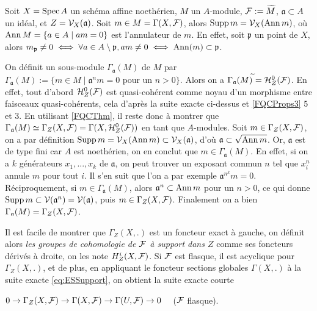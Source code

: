 \begin{ex}\label{cohomsupportaffineex}
Soit $X=\operatorname{Spec} A$ un schéma affine noethérien, $M$ un $A$-module, $\mathcal{F}:=\widetilde{M}$, $\mathfrak{a}\subset A$ un idéal, et $Z=\mathcal{V}_X(\mathfrak{a})$. Soit $m\in M=\Gamma(X,\mathcal{F})$, alors $\operatorname{Supp} m=\mathcal{V}_X(\operatorname{Ann} m)$, où $\operatorname{Ann} M=\lbrace a\in A\mid am=0\rbrace$ est l'annulateur de $m$. En effet, soit $\mathfrak{p}$ un point de $X$, alors $m_\mathfrak{p}\neq 0\iff \forall a\in A\setminus \mathfrak{p}, am\neq 0\iff \operatorname{Ann}(m)\subset \mathfrak{p}$.

On définit un sous-module $\Gamma_\mathfrak{a}(M)$ de $M$ par $\Gamma_\mathfrak{a}(M):=\lbrace m\in M\mid \mathfrak{a}^nm=0 \text{ pour un } n>0 \rbrace$. Alors on a $\Gamma_\mathfrak{a}(M)^{\widetilde{}} = \mathcal{H} ^0 _Z(\mathcal{F})$. En effet, tout d'abord $\mathcal{H}^0 _Z(\mathcal{F})$ est quasi-cohérent comme noyau d'un morphisme entre faisceaux quasi-cohérents, cela d'après la suite exacte ci-dessus et \ref{FQCProps3} $5$ et $3$. En utilisant \ref{FQCThm}, il reste donc à montrer que $\Gamma_\mathfrak{a}(M)\simeq\Gamma_Z(X,\mathcal{F})=\Gamma(X,\mathcal{H} ^0 _Z(\mathcal{F}))$ en tant que $A$-modules. Soit $m\in\Gamma_Z(X,\mathcal{F})$, on a par définition $\operatorname{Supp} m=\mathcal{V}_X(\operatorname{Ann} m)\subset \mathcal{V}_X(\mathfrak{a})$, d'où $\mathfrak{a}\subset \sqrt{\operatorname{Ann} m}$. Or, $\mathfrak{a}$ est de type fini car $A$ est noethérien, on en conclut que $m\in \Gamma_\mathfrak{a}(M)$. En effet, si on a $k$ générateurs $x_1,...,x_k$ de $\mathfrak{a}$, on peut trouver un exposant commun $n$ tel que $x^n_i$ annule $m$ pour tout $i$. Il s'en suit que l'on a par exemple $\mathfrak{a}^{n^k}m=0$. Réciproquement, si $m\in \Gamma_\mathfrak{a}(M)$, alors $\mathfrak{a}^n\subset \operatorname{Ann} m$ pour un $n>0$, ce qui donne $\operatorname{Supp} m \subset\mathcal{V}(\mathfrak{a}^n)=\mathcal{V}(\mathfrak{a})$, puis $m\in \Gamma_Z(X,\mathcal{F})$. Finalement on a bien $\Gamma_\mathfrak{a}(M)=\Gamma_Z(X,\mathcal{F})$.
\end{ex}

Il est facile de montrer que $\Gamma_Z(X, .)$ est un foncteur exact à gauche, on définit alors \textit{les groupes de cohomologie de $\mathcal{F}$ à support dans $Z$} comme ses foncteurs dérivés à droite, on les note $H_Z^i(X,\mathcal{F})$. Si $\mathcal{F}$ est flasque, il est acyclique pour $\Gamma_Z(X, .)$, et de plus, en appliquant le foncteur sections globales $\Gamma(X,.)$ à la suite exacte \ref{eq:ESSupport}, on obtient la suite exacte courte

\begin{center}
$0\rightarrow \Gamma_Z(X,\mathcal{F})\rightarrow \Gamma(X,\mathcal{F})\rightarrow \Gamma(U,\mathcal{F})\rightarrow 0\quad$ ($\mathcal{F}$ flasque).
\end{center}


